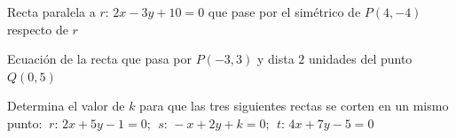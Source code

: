 \vspace{-8mm}
\begin{flushright}
\begin{footnotesize} \textcolor{gris}{}	\end{footnotesize}
\end{flushright}\vspace{-8mm}
\begin{flushright}
\begin{footnotesize} \textcolor{gris}{}	\end{footnotesize}
\end{flushright}


\begin{mipropuesto}

Recta paralela a $r:\, 2x-3y+10=0$ que pase por el simétrico de $P(4,-4)$ respecto de $r$

\end{mipropuesto}

\vspace{-8mm}
\begin{flushright}
\begin{footnotesize} \textcolor{gris}{}	\end{footnotesize}
\end{flushright}


\begin{mipropuesto}

Ecuación de la recta que pasa por $P(-3,3)$ y dista $2$ unidades del punto $Q(0,5)$

\end{mipropuesto}

\vspace{-8mm}
\begin{flushright}
\begin{footnotesize} \textcolor{gris}{}	\end{footnotesize}
\end{flushright}


\begin{mipropuesto}

Determina el valor de $k$ para que las tres siguientes rectas se corten en un mismo punto: $\ r:\, 2x+5y-1=0;\ \ s:\, -x+2y+k=0;\ \ t:\, 4x+7y-5=0$

\end{mipropuesto}

